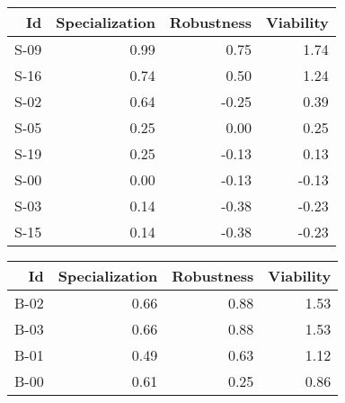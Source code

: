 


\begin{tabular}{ | r | r | r | r | }
    \hline
                    Id  &  Specialization  &      Robustness  &       Viability  \\
    \hline
    \hline
                  S-09  &            0.99  &            0.75  &            1.74  \\
    \hline
                  S-16  &            0.74  &            0.50  &            1.24  \\
    \hline
                  S-02  &            0.64  &           -0.25  &            0.39  \\
    \hline
                  S-05  &            0.25  &            0.00  &            0.25  \\
    \hline
                  S-19  &            0.25  &           -0.13  &            0.13  \\
    \hline
                  S-00  &            0.00  &           -0.13  &           -0.13  \\
    \hline
                  S-03  &            0.14  &           -0.38  &           -0.23  \\
    \hline
                  S-15  &            0.14  &           -0.38  &           -0.23  \\
    \hline
\end{tabular}


\begin{tabular}{ | r | r | r | r | }
    \hline
                    Id  &  Specialization  &      Robustness  &       Viability  \\
    \hline
    \hline
                  B-02  &            0.66  &            0.88  &            1.53  \\
    \hline
                  B-03  &            0.66  &            0.88  &            1.53  \\
    \hline
                  B-01  &            0.49  &            0.63  &            1.12  \\
    \hline
                  B-00  &            0.61  &            0.25  &            0.86  \\
    \hline
\end{tabular}


